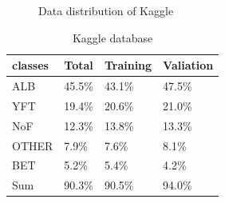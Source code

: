 \documentclass[conference]{IEEEtran}
\begin{document}
%
\IEEEpeerreviewmaketitle
\begin{figure}[!ht]
\centering
{}
  \hspace{0.05in}
  \hspace{0.05in}
  \caption{Data distribution of Kaggle}
  \label{fig:data}
\end{figure}

\begin{table}[t]
  \caption{Kaggle database}
  \label{table1}
  \centering
  \begin{tabular}{llll}
    \toprule
    \cmidrule{1-4}
    classes     & Total     & Training   &Valiation \\
    \hline
    ALB & 45.5\%  & 43.1\%  & 47.5\%     \\
    YFT     & 19.4\% & 20.6\%   &21.0\%    \\
    NoF     & 12.3\%   & 13.8\% &13.3\% \\
    OTHER & 7.9\% & 7.6\% & 8.1\% \\
    BET & 5.2\% & 5.4\% & 4.2\% \\ 
    \toprule 
    Sum & 90.3\% & 90.5\% & 94.0\% \\  
    \bottomrule
  \end{tabular}
\end{table}
\end{document}
